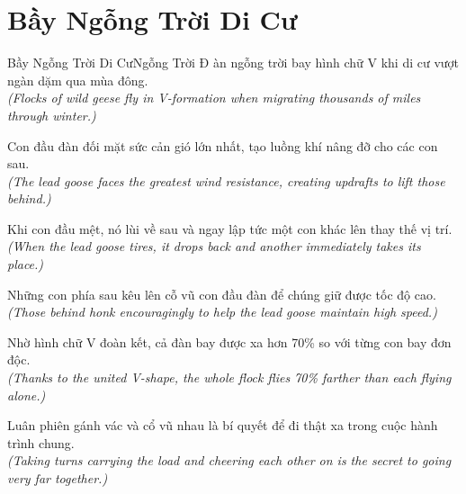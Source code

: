 \section{Bầy Ngỗng Trời Di Cư}
\begin{truyen}{Bầy Ngỗng Trời Di Cư}{Ngỗng Trời}
Đ àn ngỗng trời bay hình chữ V khi di cư vượt ngàn dặm qua mùa đông.\\
\textit{(Flocks of wild geese fly in V-formation when migrating thousands of miles through winter.)}

Con đầu đàn đối mặt sức cản gió lớn nhất, tạo luồng khí nâng đỡ cho các con sau.\\
\textit{(The lead goose faces the greatest wind resistance, creating updrafts to lift those behind.)}

Khi con đầu mệt, nó lùi về sau và ngay lập tức một con khác lên thay thế vị trí.\\
\textit{(When the lead goose tires, it drops back and another immediately takes its place.)}

Những con phía sau kêu lên cỗ vũ con đầu đàn để chúng giữ được tốc độ cao.\\
\textit{(Those behind honk encouragingly to help the lead goose maintain high speed.)}

Nhờ hình chữ V đoàn kết, cả đàn bay được xa hơn 70\% so với từng con bay đơn độc.\\
\textit{(Thanks to the united V-shape, the whole flock flies 70\% farther than each flying alone.)}

\end{truyen}
\begin{baihoc}
  Luân phiên gánh vác và cổ vũ nhau là bí quyết để đi thật xa trong cuộc hành trình chung.\\
  \textit{(Taking turns carrying the load and cheering each other on is the secret to going very far together.)}
\end{baihoc}

